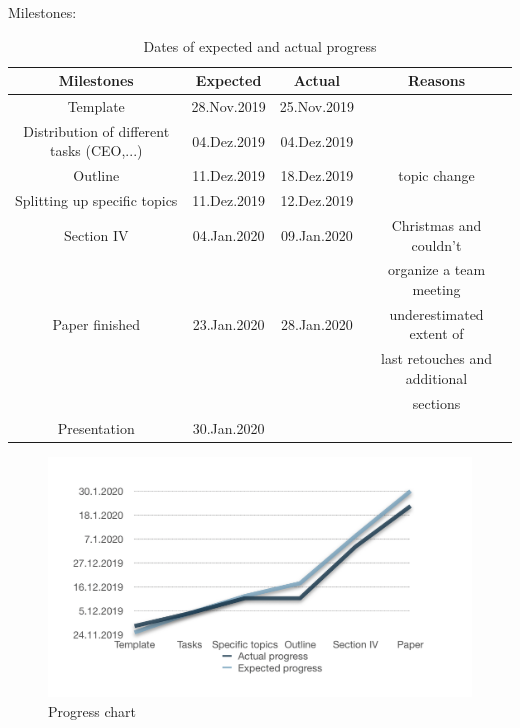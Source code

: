 Milestones:
\begin{table}[H]
\caption{Dates of expected and actual progress}
\centering
\begin{tabular}{cccc}
\toprule
Milestones & Expected & Actual& Reasons\\
\midrule
Template & 28.Nov.2019 & 25.Nov.2019&\\
Distribution of different tasks (CEO,...) & 04.Dez.2019 &04.Dez.2019&\\
Outline & 11.Dez.2019& 18.Dez.2019& topic change\\
Splitting up specific topics & 11.Dez.2019&12.Dez.2019\\
Section IV & 04.Jan.2020&09.Jan.2020& Christmas and couldn't\\
&&& organize a team meeting\\
Paper finished& 23.Jan.2020& 28.Jan.2020& underestimated extent of\\
&&& last retouches and additional \\
&&&sections\\
Presentation & 30.Jan.2020& &\\
\bottomrule
\end{tabular}
\end{table}
\begin{parcolumns}[colwidths={1=2.5 cm, 2=10 cm, 3=2.5cm}]{3}
\colchunk{}
\end{parcolumns}
\begin{figure}[H]
\centering
\includegraphics[scale=0.5]{Progress_chart}
\caption{Progress chart}
\end{figure}

